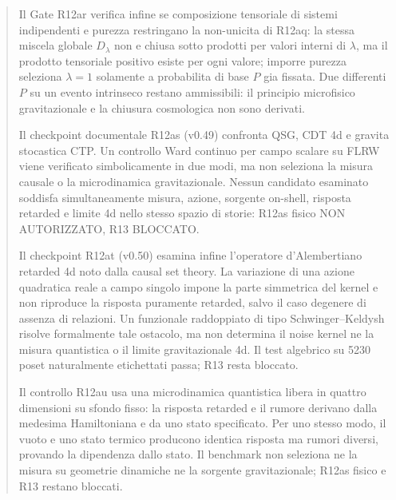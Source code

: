\documentclass[11pt,a4paper]{article}
\begin{document}
\begin{abstract}
Il Gate R12ar verifica infine se composizione tensoriale di sistemi
indipendenti e purezza restringano la non-unicita di R12aq: la stessa
miscela globale $D_\lambda$ non e chiusa sotto prodotti per valori interni
di $\lambda$, ma il prodotto tensoriale positivo esiste per ogni valore;
imporre purezza seleziona $\lambda=1$ solamente a probabilita di base
$P$ gia fissata. Due differenti $P$ su un evento intrinseco restano
ammissibili: il principio microfisico gravitazionale e la chiusura
cosmologica non sono derivati.
\par Il checkpoint documentale R12as (v0.49) confronta QSG, CDT 4d e gravita stocastica CTP. Un controllo Ward continuo per campo scalare su FLRW viene verificato simbolicamente in due modi, ma non seleziona la misura causale o la microdinamica gravitazionale. Nessun candidato esaminato soddisfa simultaneamente misura, azione, sorgente on-shell, risposta retarded e limite 4d nello stesso spazio di storie: R12as fisico NON AUTORIZZATO, R13 BLOCCATO.\par
Il checkpoint R12at (v0.50) esamina infine l'operatore d'Alembertiano
retarded 4d noto dalla causal set theory. La variazione di una azione
quadratica reale a campo singolo impone la parte simmetrica del kernel e
non riproduce la risposta puramente retarded, salvo il caso degenere di
assenza di relazioni. Un funzionale raddoppiato di tipo Schwinger--Keldysh
risolve formalmente tale ostacolo, ma non determina il noise kernel ne
la misura quantistica o il limite gravitazionale 4d. Il test algebrico
su 5230 poset naturalmente etichettati passa; R13 resta bloccato.\par
\par\smallskip Il controllo R12au usa una microdinamica quantistica libera in quattro dimensioni su sfondo fisso: la risposta retarded e il rumore derivano dalla medesima Hamiltoniana e da uno stato specificato. Per uno stesso modo, il vuoto e uno stato termico producono identica risposta ma rumori diversi, provando la dipendenza dallo stato. Il benchmark non seleziona ne la misura su geometrie dinamiche ne la sorgente gravitazionale; R12as fisico e R13 restano bloccati.\par


\end{abstract}
\end{document}
